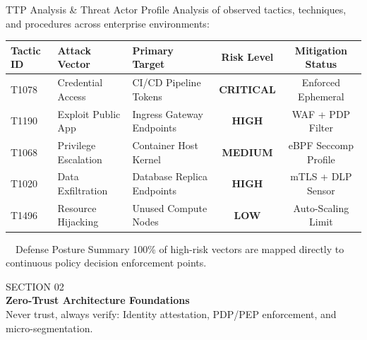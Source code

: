 \documentclass[aspectratio=169, 10pt]{beamer}
\begin{document}
\begin{frame}{TTP Analysis \& Threat Actor Profile}
  \vspace{-4pt}
  {\small\color{textmuted} Analysis of observed tactics, techniques, and procedures across enterprise environments:}
  \vspace{4pt}
  
  \begin{center}
    \small
    \begin{tabular}{lp{3.5cm}p{3.8cm}cc}
      \toprule
      \color{cybercyan}\textbf{Tactic ID} & \color{cybercyan}\textbf{Attack Vector} & \color{cybercyan}\textbf{Primary Target} & \color{cybercyan}\textbf{Risk Level} & \color{cybercyan}\textbf{Mitigation Status} \\
      \midrule
      T1078 & Credential Access & CI/CD Pipeline Tokens & \color{cyberred}\textbf{CRITICAL} & \color{cybergreen}Enforced Ephemeral \\{}
      T1190 & Exploit Public App & Ingress Gateway Endpoints & \color{cyberred}\textbf{HIGH} & \color{cybergreen}WAF + PDP Filter \\{}
      T1068 & Privilege Escalation & Container Host Kernel & \color{cyberamber}\textbf{MEDIUM} & \color{cybergreen}eBPF Seccomp Profile \\{}
      T1020 & Data Exfiltration & Database Replica Endpoints & \color{cyberred}\textbf{HIGH} & \color{cybergreen}mTLS + DLP Sensor \\{}
      T1496 & Resource Hijacking & Unused Compute Nodes & \color{cyberamber}\textbf{LOW} & \color{cybergreen}Auto-Scaling Limit \\
      \bottomrule
    \end{tabular}
  \end{center}

  \vspace{4pt}
  \begin{cybercard}{\faLock\ \ Defense Posture Summary}
    {\small 100\% of high-risk vectors are mapped directly to continuous policy decision enforcement points.}
  \end{cybercard}
\end{frame}

\begin{frame}[plain]
  \vfill
  \begin{tcolorbox}[
    enhanced,
    colback=bgcard,
    colframe=cybergreen,
    arc=4pt,
    boxrule=1.2pt,
    left=15pt, right=15pt, top=15pt, bottom=15pt
  ]
    {\ttfamily\color{cybergreen}\large SECTION 02} \\[4pt]
    {\Huge\bfseries\color{textlight} Zero-Trust Architecture Foundations} \\[8pt]
    {\color{textmuted}\small Never trust, always verify: Identity attestation, PDP/PEP enforcement, and micro-segmentation.}
  \end{tcolorbox}
  \vfill
\end{frame}
\end{document}
